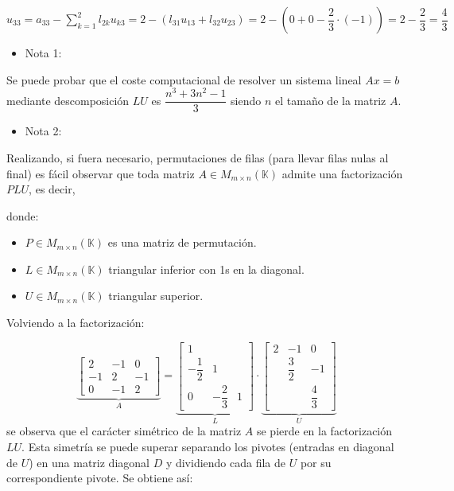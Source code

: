 \documentclass[12pt]{article}
\begin{document}
$u_{33}=a_{33}-\sum_{k=1}^{2}l_{2k}u_{k3}=2-(l_{31}u_{13}+l_{32}u_{23})=2-\left(0+0-\dfrac{2}{3}\cdot(-1)\right)=2-\dfrac{2}{3}=\dfrac{4}{3}$
\begin{itemize}[label=\color{red}\textbullet, leftmargin=*]
    \item \color{lightblue} Nota 1:
\end{itemize}
Se puede probar que el coste computacional de resolver un
sistema lineal $Ax=b$ mediante descomposición $LU$ es
$\dfrac{n^3+3n^2-1}{3}$ siendo $n$ el tamaño de la matriz $A$.
\begin{itemize}[label=\color{red}\textbullet, leftmargin=*]
    \item \color{lightblue} Nota 2:
\end{itemize}
Realizando, si fuera necesario, permutaciones de filas (para
llevar filas nulas al final) es fácil observar que toda matriz
$A\in M_{m\times n}(\mathbb{K})$ admite una factorización $PLU$,
es decir, \begin{center}
\end{center}donde:

\begin{itemize}
\item $P\in M_{m\times n}(\mathbb{K})$ es una matriz de
permutación.
\item $L\in M_{m\times n}(\mathbb{K})$ triangular inferior con
1s en la diagonal.
\item $U\in M_{m\times n}(\mathbb{K})$ triangular superior.
\end{itemize}
Volviendo a la factorización:

$$\underbrace{\begin{bmatrix}
2 & -1 & 0 \\ 
-1 & 2 & -1 \\ 
0 & -1 & 2
\end{bmatrix} }_A=\underbrace{\begin{bmatrix}
1 &  &  \\ 
-\dfrac{1}{2} & 1 &  \\ 
0 & -\dfrac{2}{3} & 1
\end{bmatrix} }_L\cdot\underbrace{\begin{bmatrix}
2 & -1 & 0 \\ 
 & \dfrac{3}{2} & -1 \\ 
 &  & \dfrac{4}{3}
\end{bmatrix} }_U$$
se observa que el carácter simétrico de la matriz $A$ se pierde
en la factorización $LU$. Esta simetría se puede superar
separando los pivotes (entradas en diagonal de $U$) en una
matriz diagonal $D$ y dividiendo cada fila de $U$ por su
correspondiente pivote. Se obtiene así:
\end{document}
